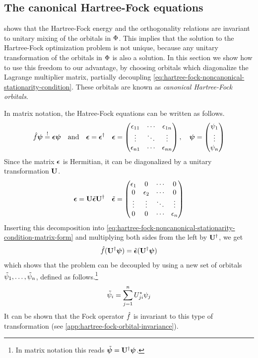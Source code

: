 \documentclass[11pt]{article}
\numberwithin{equation}{section}
\begin{document}
\subsection{The canonical Hartree-Fock equations}


 shows that the Hartree-Fock energy and the orthogonality relations are invariant to unitary mixing of the orbitals in $\Phi $.
This implies that the solution to the Hartree-Fock optimization problem is not unique, because any unitary transformation of the orbitals in $\Phi $ is also a solution.
In this section we show how to use this freedom to our advantage, by choosing orbitals which diagonalize the Lagrange multiplier matrix, partially decoupling \cref{eq:hartree-fock-noncanonical-stationarity-condition}.
These orbitals are known as \textit{canonical Hartree-Fock orbitals}.

In matrix notation, the Hatree-Fock equations can be written as follows.
\begin{align}\label{eq:hartree-fock-noncanonical-stationarity-condition-matrix-form}
  \op{f}\bm\y
\overset{!}=
  \bm{\ev}\bm{\y}
\hspace{10pt}
  \text{and}
\hspace{10pt}
  \bm{\ev}=\bm{\ev}\dg
&&
  \bm{\ev}
=
  \ma{
    \ev_{11}&\cd&\ev_{1n}\\
    \vd&\dd&\vd\\
    \ev_{n1}&\cd&\ev_{nn}
  },
\hspace{10pt}
  \bm\y
=
  \ma{\y_1\\\vd\\\y_n}
\end{align}
Since the matrix $\bm{\ev}$ is Hermitian, it can be diagonalized by a unitary transformation $\mathbf{U}$.
\begin{align}
  \bm{\ev}
=
  \bo{U}\tl{\bm{\ev}}\bo{U}\dg
&&
  \tl{\bm{\ev}}
=
  \ma{
    \ev_1& 0 & \cd & 0\\
    0 & \ev_2 &\cd & 0\\
    \vd & \vd &\dd & \vd \\
    0 & 0 & \cd & \ev_n
  }
\end{align}
Inserting this decomposition into \cref{eq:hartree-fock-noncanonical-stationarity-condition-matrix-form} and multiplying both sides from the left by $\mathbf{U}^\dagger$, we get
\begin{align*}
  \op{f}(\bo{U}\dg\bm\y)
=
  \tl{\bm{\ev}}(\bo{U}\dg\bm\y)
\end{align*}
which shows that the problem can be decoupled by using a new set of orbitals  $\tilde{\psi }_1,\ldots,\tilde{\psi }_n$, defined as follows.\footnote{In matrix notation this reads $\tl{\bm\y}=\bo{U}\dg\bm\y$.}
\begin{align}
  \tilde{\psi }_i
=
  \sum_{j=1}^n U_{ji}^*\psi _j
\end{align}
It can be shown that the Fock operator $\hat{f}$ is invariant to this type of transformation (see \cref{app:hartree-fock-orbital-invariance}).
\end{document}
